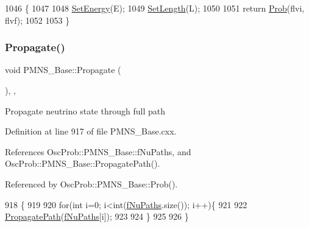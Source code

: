 \begin{DoxyCode}
1046 \{
1047 
1048   \hyperlink{classOscProb_1_1PMNS__Base_a95b3b0d0cab5e6a54b5ef99587f837c0}{SetEnergy}(E);
1049   \hyperlink{classOscProb_1_1PMNS__Base_a6241325b1bd28cafa556daaecbe4ed62}{SetLength}(L);
1050 
1051   \textcolor{keywordflow}{return} \hyperlink{classOscProb_1_1PMNS__Base_aec5c399b93261f1962a4b7dbbb44b973}{Prob}(flvi, flvf);
1052 
1053 \}
\end{DoxyCode}
\mbox{\label{classOscProb_1_1PMNS__Base_a054e3a8b05b9a958b6fa416e4a835e3e}} 
\subsubsection{\texorpdfstring{Propagate()}{Propagate()}}
{\footnotesize\ttfamily void P\+M\+N\+S\+\_\+\+Base\+::\+Propagate (\begin{DoxyParamCaption}{ }\end{DoxyParamCaption})\hspace{0.3cm}{\ttfamily [protected]}, {\ttfamily [virtual]}, {\ttfamily [inherited]}}

Propagate neutrino state through full path 

Definition at line 917 of file P\+M\+N\+S\+\_\+\+Base.\+cxx.



References Osc\+Prob\+::\+P\+M\+N\+S\+\_\+\+Base\+::f\+Nu\+Paths, and Osc\+Prob\+::\+P\+M\+N\+S\+\_\+\+Base\+::\+Propagate\+Path().



Referenced by Osc\+Prob\+::\+P\+M\+N\+S\+\_\+\+Base\+::\+Prob().


\begin{DoxyCode}
918 \{
919 
920   \textcolor{keywordflow}{for}(\textcolor{keywordtype}{int} i=0; i<int(\hyperlink{classOscProb_1_1PMNS__Base_a69db9d57e12fc7cbe0431bc6c18fac93}{fNuPaths}.size()); i++)\{
921 
922     \hyperlink{classOscProb_1_1PMNS__Base_accb08503acc162188041d7a96a280462}{PropagatePath}(\hyperlink{classOscProb_1_1PMNS__Base_a69db9d57e12fc7cbe0431bc6c18fac93}{fNuPaths}[i]);
923 
924   \}
925 
926 \}
\end{DoxyCode}
\mbox{\label{classOscProb_1_1PMNS__Deco_aa75341a3608bb12d7792a14e67ef2d5e}} 
